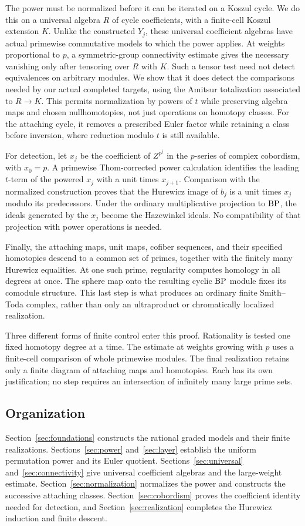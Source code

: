 The power must be normalized before it can be iterated on a Koszul
cycle. We do this on a universal algebra $R$ of cycle coefficients,
with a finite-cell Koszul extension $K$. Unlike the constructed $Y_j$,
these universal coefficient algebras have actual primewise commutative
models to which the power applies. At weights proportional to
$p$, a symmetric-group connectivity estimate gives the necessary
vanishing only after tensoring over $R$ with $K$. Such a tensor test
need not detect equivalences on arbitrary modules. We show that it
does detect the comparisons needed by our actual completed targets,
using the Amitsur totalization associated to $R\to K$. This permits
normalization by powers of $t$ while preserving algebra maps and
chosen nullhomotopies, not just operations on homotopy classes.
For the attaching cycle, it removes a prescribed Euler factor while
retaining a class before inversion, where reduction modulo $t$ is
still available.

For detection, let $x_j$ be the coefficient of $Z^{p^j}$ in the
$p$-series of complex cobordism, with $x_0=p$. A primewise
Thom-corrected power calculation identifies the leading $t$-term
of the powered $x_j$ with a unit times $x_{j+1}$. Comparison with
the normalized construction proves that the Hurewicz image of
$b_j$ is a unit times $x_j$ modulo its predecessors. Under the
ordinary multiplicative projection to $\mathrm{BP}$, the ideals generated
by the $x_j$ become the Hazewinkel ideals. No compatibility of that
projection with power operations is needed.

Finally, the attaching maps, unit maps, cofiber sequences, and their
specified homotopies descend to a common set of primes, together with
the finitely many Hurewicz equalities.
At one such prime, regularity computes homology in all degrees at
once. The sphere map onto the resulting cyclic $\mathrm{BP}$ module fixes
its comodule structure. This last step is what produces an ordinary
finite Smith--Toda complex, rather than only an ultraproduct or
chromatically localized realization.

Three different forms of finite control enter this proof. Rationality
is tested one fixed homotopy degree at a time. The estimate at weights
growing with $p$ uses a finite-cell comparison of whole primewise
modules. The final realization retains only a finite diagram of
attaching maps and homotopies. Each has its own justification; no
step requires an intersection of infinitely many large prime sets.

\subsection{Organization}
Section~\ref{sec:foundations} constructs the rational graded models
and their finite realizations. Sections~\ref{sec:power}
and~\ref{sec:layer} establish the uniform permutation power and its
Euler quotient. Sections~\ref{sec:universal}
and~\ref{sec:connectivity} give universal coefficient algebras and
the large-weight estimate. Section~\ref{sec:normalization}
normalizes the power and constructs the successive attaching classes.
Section~\ref{sec:cobordism} proves the coefficient identity needed
for detection, and Section~\ref{sec:realization} completes the
Hurewicz induction and finite descent.
